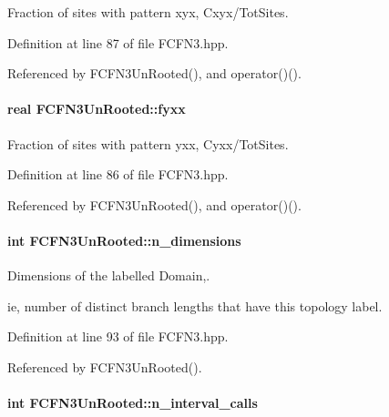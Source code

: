 \-Fraction of sites with pattern xyx, \-Cxyx/\-Tot\-Sites. 



\-Definition at line 87 of file \-F\-C\-F\-N3.\-hpp.



\-Referenced by \-F\-C\-F\-N3\-Un\-Rooted(), and operator()().

\hypertarget{classFCFN3UnRooted_a283443b3c043b8859da0a3c2e24c5263}{
\paragraph[{fyxx}]{\setlength{\rightskip}{0pt plus 5cm}real {\bf \-F\-C\-F\-N3\-Un\-Rooted\-::fyxx}}}\label{classFCFN3UnRooted_a283443b3c043b8859da0a3c2e24c5263}


\-Fraction of sites with pattern yxx, \-Cyxx/\-Tot\-Sites. 



\-Definition at line 86 of file \-F\-C\-F\-N3.\-hpp.



\-Referenced by \-F\-C\-F\-N3\-Un\-Rooted(), and operator()().

\hypertarget{classFCFN3UnRooted_afa33271d74b5e545e53a451ca05c803c}{
\paragraph[{n\-\_\-dimensions}]{\setlength{\rightskip}{0pt plus 5cm}int {\bf \-F\-C\-F\-N3\-Un\-Rooted\-::n\-\_\-dimensions}}}\label{classFCFN3UnRooted_afa33271d74b5e545e53a451ca05c803c}


\-Dimensions of the labelled \-Domain,. 

ie, number of distinct branch lengths that have this topology label. 

\-Definition at line 93 of file \-F\-C\-F\-N3.\-hpp.



\-Referenced by \-F\-C\-F\-N3\-Un\-Rooted().

\hypertarget{classFCFN3UnRooted_a901a8fc0d1aaf9ce8d74898a493aef25}{
\paragraph[{n\-\_\-interval\-\_\-calls}]{\setlength{\rightskip}{0pt plus 5cm}int {\bf \-F\-C\-F\-N3\-Un\-Rooted\-::n\-\_\-interval\-\_\-calls}}}\label{classFCFN3UnRooted_a901a8fc0d1aaf9ce8d74898a493aef25}


